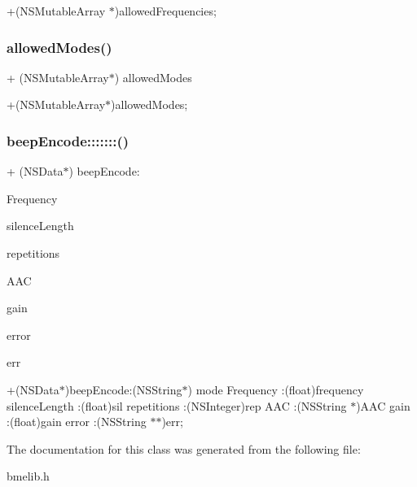+(N\+S\+Mutable\+Array $\ast$)allowed\+Frequencies; \mbox{\label{interfacebmelib_a43dc77d50438093b591f4bb83ebce82f}} 
\subsubsection{\texorpdfstring{allowed\+Modes()}{allowedModes()}}
{\footnotesize\ttfamily + (N\+S\+Mutable\+Array$\ast$) allowed\+Modes \begin{DoxyParamCaption}{ }\end{DoxyParamCaption}}

+(N\+S\+Mutable\+Array$\ast$)allowed\+Modes; \mbox{\label{interfacebmelib_a65726775961be05028282831d3bc83fb}} 
\subsubsection{\texorpdfstring{beep\+Encode\+:::::::()}{beepEncode:::::::()}}
{\footnotesize\ttfamily + (N\+S\+Data$\ast$) beep\+Encode\+: \begin{DoxyParamCaption}\item[{(N\+S\+String $\ast$)}]{Frequency }\item[{:(float)}]{silence\+Length }\item[{:(float)}]{repetitions }\item[{:(N\+S\+Integer)}]{A\+AC }\item[{:(N\+S\+String $\ast$)}]{gain }\item[{:(float)}]{error }\item[{:(N\+S\+String $\ast$$\ast$)}]{err }\end{DoxyParamCaption}}

+(N\+S\+Data$\ast$)beep\+Encode\+:(\+N\+S\+String$\ast$) mode Frequency \+:(float)frequency silence\+Length \+:(float)sil repetitions \+:(N\+S\+Integer)rep A\+AC \+:(N\+S\+String $\ast$)A\+AC gain \+:(float)gain error \+:(N\+S\+String $\ast$$\ast$)err; 

The documentation for this class was generated from the following file\+:\begin{DoxyCompactItemize}
\item 
bmelib.\+h\end{DoxyCompactItemize}
